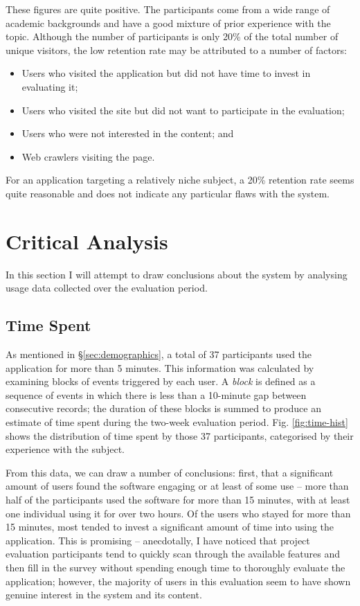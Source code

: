 \documentclass[bsc,twoside,singlespacing,parskip,logo,notimes,normalheadings]{infthesis}
\begin{document}
    These figures are quite positive. The participants come from a
    wide range of academic backgrounds and have a good mixture of
    prior experience with the topic. Although the number of
    participants is only 20\% of the total number of unique visitors,
    the low retention rate may be attributed to a number of factors:

    \begin{itemize}
    \item Users who visited the application but did not have time to
      invest in evaluating it;
    \item Users who visited the site but did not want to participate
      in the evaluation;
    \item Users who were not interested in the content; and
    \item Web crawlers visiting the page.
    \end{itemize}

    For an application targeting a relatively niche subject, a 20\%
    retention rate seems quite reasonable and does not indicate any
    particular flaws with the system.

    \section{Critical Analysis}
    In this section I will attempt to draw conclusions about the
    system by analysing usage data collected over the evaluation
    period.

    \subsection{Time Spent}

    As mentioned in \S\ref{sec:demographics}, a total of 37
    participants used the application for more than 5 minutes. This
    information was calculated by examining blocks of events triggered
    by each user. A {\em block} is defined as a sequence of events in
    which there is less than a 10-minute gap between consecutive
    records; the duration of these blocks is summed to produce an
    estimate of time spent during the two-week evaluation
    period. Fig. \ref{fig:time-hist} shows the distribution of time
    spent by those 37 participants, categorised by their experience
    with the subject.

    From this data, we can draw a number of conclusions: first, that a
    significant amount of users found the software engaging or at
    least of some use -- more than half of the participants used the
    software for more than 15 minutes, with at least one individual
    using it for over two hours. Of the users who stayed for more than
    15 minutes, most tended to invest a significant amount of time
    into using the application. This is promising -- anecdotally, I
    have noticed that project evaluation participants tend to quickly
    scan through the available features and then fill in the survey
    without spending enough time to thoroughly evaluate the
    application; however, the majority of users in this evaluation
    seem to have shown genuine interest in the system and its content.
\end{document}
